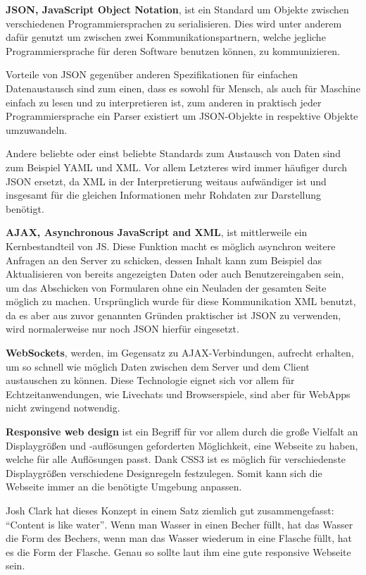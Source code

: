 \documentclass[a4paper,12pt,ngerman,listof=numbered]{scrartcl}      %
\let\oldcite\cite
\renewcommand{\cite}[1]{\textsuperscript{\oldcite{#1}}}
\newcommand{\spacer}{\par\bigskip\noindent}
\begin{document}
	\spacer\textbf{JSON, JavaScript Object Notation}, ist ein Standard um Objekte zwischen verschiedenen Programmiersprachen zu serialisieren. Dies wird unter anderem dafür genutzt um zwischen zwei Kommunikationspartnern, welche jegliche Programmiersprache für deren Software benutzen können, zu kommunizieren.\par
	Vorteile von JSON gegenüber anderen Spezifikationen für einfachen Datenaustausch sind zum einen, dass es sowohl für Mensch, als auch für Maschine einfach zu lesen und zu interpretieren ist, zum anderen in praktisch jeder Programmiersprache ein Parser existiert um JSON-Objekte in respektive Objekte umzuwandeln.\cite{json}\par
	Andere beliebte oder einst beliebte Standards zum Austausch von Daten sind zum Beispiel YAML und XML. Vor allem Letzteres wird immer häufiger durch JSON ersetzt, da XML in der Interpretierung weitaus aufwändiger ist und insgesamt für die gleichen Informationen mehr Rohdaten zur Darstellung benötigt.\par
	
	\spacer\textbf{AJAX, Asynchronous JavaScript and XML}, ist mittlerweile ein Kernbestandteil von JS. Diese Funktion macht es möglich asynchron weitere Anfragen an den Server zu schicken, dessen Inhalt kann zum Beispiel das Aktualisieren von bereits angezeigten Daten oder auch Benutzereingaben sein, um das Abschicken von Formularen ohne ein Neuladen der gesamten Seite möglich zu machen. Ursprünglich wurde für diese Kommunikation XML benutzt, da es aber aus zuvor genannten Gründen praktischer ist JSON zu verwenden, wird normalerweise nur noch JSON hierfür eingesetzt.\cite{ajaxWiki}\par
	
	\spacer\textbf{WebSockets}, werden, im Gegensatz zu AJAX-Verbindungen, aufrecht erhalten, um so schnell wie möglich Daten zwischen dem Server und dem Client austauschen zu können. Diese Technologie eignet sich vor allem für Echtzeitanwendungen, wie Livechats und Browserspiele, sind aber für WebApps nicht zwingend notwendig.\cite{websocketWiki}\par
	
	\spacer\textbf{Responsive web design} ist ein Begriff für vor allem durch die große Vielfalt an Displaygrößen und -auflösungen geforderten Möglichkeit, eine Webseite zu haben, welche für alle Auflösungen passt. Dank CSS3 ist es möglich für verschiedenste Displaygrößen verschiedene Designregeln festzulegen. Somit kann sich die Webseite immer an die benötigte Umgebung anpassen.\par
	Josh Clark hat dieses Konzept in einem Satz ziemlich gut zusammengefasst: ``Content is like water''\cite{wikiResponsive}. Wenn man Wasser in einen Becher füllt, hat das Wasser die Form des Bechers, wenn man das Wasser wiederum in eine Flasche füllt, hat es die Form der Flasche. Genau so sollte laut ihm eine gute responsive Webseite sein.\par
	
\end{document}
